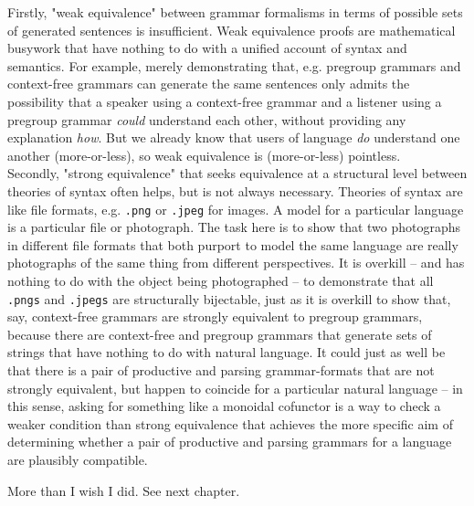 Firstly, "weak equivalence" between grammar formalisms in terms of possible sets of generated sentences is insufficient. Weak equivalence proofs are mathematical busywork that have nothing to do with a unified account of syntax and semantics. For example, merely demonstrating that, e.g. pregroup grammars and context-free grammars can generate the same sentences \citep{buszkowski_pregroup_nodate} only admits the possibility that a speaker using a context-free grammar and a listener using a pregroup grammar \emph{could} understand each other, without providing any explanation \emph{how}. But we already know that users of language \emph{do} understand one another (more-or-less), so weak equivalence is (more-or-less) pointless.\\

Secondly, "strong equivalence" that seeks equivalence at a structural level between theories of syntax often helps, but is not always necessary. Theories of syntax are like file formats, e.g. \texttt{.png} or \texttt{.jpeg} for images. A model for a particular language is a particular file or photograph. The task here is to show that two photographs in different file formats that both purport to model the same language are really photographs of the same thing from different perspectives. It is overkill -- and has nothing to do with the object being photographed -- to demonstrate that all \texttt{.pngs} and \texttt{.jpegs} are structurally bijectable, just as it is overkill to show that, say, context-free grammars are strongly equivalent to pregroup grammars, because there are context-free and pregroup grammars that generate sets of strings that have nothing to do with natural language. It could just as well be that there is a pair of productive and parsing grammar-formats that are not strongly equivalent, but happen to coincide for a particular natural language -- in this sense, asking for something like a monoidal cofunctor is a way to check a weaker condition than strong equivalence that achieves the more specific aim of determining whether a pair of productive and parsing grammars for a language are plausibly compatible.

 More than I wish I did. See next chapter.